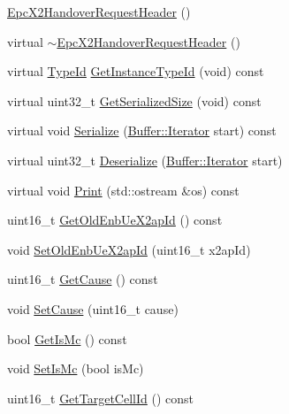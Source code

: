 \begin{DoxyCompactItemize}
\item 
\hyperlink{classns3_1_1EpcX2HandoverRequestHeader_a400044257ea338d1778f6795293cf33c}{Epc\+X2\+Handover\+Request\+Header} ()
\item 
virtual \hyperlink{classns3_1_1EpcX2HandoverRequestHeader_a75aad539e671dde141258cef04ef8eb2}{$\sim$\+Epc\+X2\+Handover\+Request\+Header} ()
\item 
virtual \hyperlink{classns3_1_1TypeId}{Type\+Id} \hyperlink{classns3_1_1EpcX2HandoverRequestHeader_a7b9b75e907ae9ba4e062decd0d4c96fd}{Get\+Instance\+Type\+Id} (void) const 
\item 
virtual uint32\+\_\+t \hyperlink{classns3_1_1EpcX2HandoverRequestHeader_a68606629133183008b56871ae8b9f903}{Get\+Serialized\+Size} (void) const 
\item 
virtual void \hyperlink{classns3_1_1EpcX2HandoverRequestHeader_afab50392829e9534735e735bd79c34db}{Serialize} (\hyperlink{classns3_1_1Buffer_1_1Iterator}{Buffer\+::\+Iterator} start) const 
\item 
virtual uint32\+\_\+t \hyperlink{classns3_1_1EpcX2HandoverRequestHeader_ab7fe92cfc44a8726ea13dcd87c94ad45}{Deserialize} (\hyperlink{classns3_1_1Buffer_1_1Iterator}{Buffer\+::\+Iterator} start)
\item 
virtual void \hyperlink{classns3_1_1EpcX2HandoverRequestHeader_a6f6c8aa64f320be24e65416bce97e956}{Print} (std\+::ostream \&os) const 
\item 
uint16\+\_\+t \hyperlink{classns3_1_1EpcX2HandoverRequestHeader_a75e39ba7f60bb5a41a08163a7e947171}{Get\+Old\+Enb\+Ue\+X2ap\+Id} () const 
\item 
void \hyperlink{classns3_1_1EpcX2HandoverRequestHeader_ab14d1ccaf82babee6b660079bc5dc3db}{Set\+Old\+Enb\+Ue\+X2ap\+Id} (uint16\+\_\+t x2ap\+Id)
\item 
uint16\+\_\+t \hyperlink{classns3_1_1EpcX2HandoverRequestHeader_a06f3067dc939f60cf918e910cfce1cde}{Get\+Cause} () const 
\item 
void \hyperlink{classns3_1_1EpcX2HandoverRequestHeader_a13a70916ab8b2de47784f6b96cc9d887}{Set\+Cause} (uint16\+\_\+t cause)
\item 
bool \hyperlink{classns3_1_1EpcX2HandoverRequestHeader_a7a40571a458f6d00f2640911c8ed7cba}{Get\+Is\+Mc} () const 
\item 
void \hyperlink{classns3_1_1EpcX2HandoverRequestHeader_ad599f8de40589f59005dfc427799ff2d}{Set\+Is\+Mc} (bool is\+Mc)
\item 
uint16\+\_\+t \hyperlink{classns3_1_1EpcX2HandoverRequestHeader_ac31ef53cfcd9cc828347c2677d40f396}{Get\+Target\+Cell\+Id} () const 

\end{DoxyCompactItemize}
